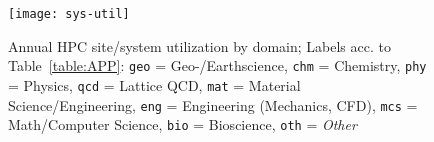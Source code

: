 \begin{figure}[tbp]
    \centering
    \texttt{[image: sys-util]}
    \caption{\label{fid:disc:breakdown} Annual HPC site/system utilization by domain; Labels acc. to Table~\ref{table:APP}: \texttt{geo} = Geo-/Earthscience, \texttt{chm} = Chemistry, \texttt{phy} = Physics, \texttt{qcd} = Lattice QCD, \texttt{mat} = Material Science/Engineering, \texttt{eng} = Engineering (Mechanics, CFD), \texttt{mcs} = Math/Computer Science, \texttt{bio} = Bioscience, \texttt{oth} = \textit{Other}}
\end{figure}

\begin{comment}
\begin{table*}[tbp]
\begin{tabular}{|l|l|l|l|c|c|c|c|c|c|c|c|c|}
\hline
\multicolumn{1}{|c|}{System} & \multicolumn{1}{c|}{Host Institution}     & Description                      & \multicolumn{1}{c|}{Year} & \begin{tabular}[c]{@{}c@{}}Geoscience/\\ Earthscience\end{tabular} & Chemistry & Physics & Lattice QCD & Material Science/Engineering & \begin{tabular}[c]{@{}c@{}}Engineering\\ (Mechanics, CFD)\end{tabular} & Math/Computer Science & Bioscience & Other \\ \hline
ANL                          & Argonne National Lab, USA                 & All compute resources of ALCC    & 2016                      & 8                                                                  & 9         & 30      & 0           & 0                            & 22                                                                     & 10                    & 1          & 20    \\ \hline
NERSC                        & NERSC, Lawrence Berkeley Lab, USA         & All compute resources of NERSC   & 2016                      & 15                                                                 & 7         & 33      & 12          & 13                           & 2                                                                      & 5                     & 2          & 11    \\ \hline
HLRS                         & HPC Center Stuttgart, DEU                 & All compute resources of HLRS    & 2017                      & 7                                                                  & 6         & 31      & 0           & 0                            & 42                                                                     & 0                     & 3          & 11    \\ \hline

\end{comment}
